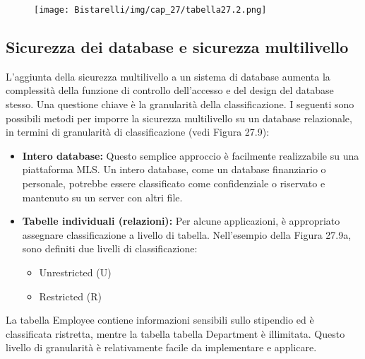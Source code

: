 \begin{figure}[H]
	\centering
    \texttt{[image: Bistarelli/img/cap\_27/tabella27.2.png]}
\end{figure}


\subsection{Sicurezza dei database e sicurezza multilivello}
L'aggiunta della sicurezza multilivello a un sistema di database aumenta la complessità della funzione di controllo dell'accesso e del design del database stesso. Una questione chiave è la granularità della classificazione. I seguenti sono possibili metodi per imporre la sicurezza multilivello su un database relazionale, in termini di granularità di classificazione (vedi Figura 27.9):
\begin{itemize}
    \item \textbf{Intero database:} Questo semplice approccio è facilmente realizzabile su una piattaforma MLS. Un intero database, come un database finanziario o personale, potrebbe essere classificato come confidenziale o riservato e mantenuto su un server con altri file.
    
    \item \textbf{Tabelle individuali (relazioni):} Per alcune applicazioni, è appropriato assegnare classificazione a livello di tabella. Nell'esempio della Figura 27.9a, sono definiti due livelli di classificazione:
    \begin{itemize}
        \item Unrestricted (U)
        \item Restricted (R)
    \end{itemize}
\end{itemize}
La tabella Employee contiene informazioni sensibili sullo stipendio ed è classificata ristretta, mentre la tabella tabella Department è illimitata. Questo livello di granularità è relativamente facile da implementare e applicare.

